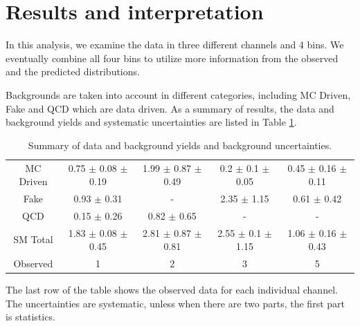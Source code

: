 \section{Results and interpretation}
\label{sect:stat}
In this analysis, we examine the data in three different channels and 4 bins.
We eventually combine all four bins to utilize more information from the observed and the predicted distributions.

Backgrounds are taken into account in different categories, including MC Driven, Fake and QCD which are data driven.
As a summary of results, the data and background yields and systematic uncertainties are listed in Table \ref{tbl:yieldSysSummary}. 
\begin{table}[h]
\begin{center}
\begin{tabular}{c|c|c|c|c}
\hline
\hline
		& \tauTau\binone & \tauTau\bintwo & \eTau\binone & \muTau\binone \\
\hline
MC Driven& 0.75 $\pm$ 0.08 $\pm$ 0.19 & 1.99 $\pm$ 0.87 $\pm$ 0.49  & 0.2 $\pm$ 0.1 $\pm$ 0.05 & 0.45 $\pm$ 0.16  $\pm$ 0.11\\
Fake    &     0.93 $\pm$ 0.31         &           -                 &     2.35 $\pm$ 1.15       &      0.61 $\pm$  0.42\\
QCD     &     0.15 $\pm$ 0.26         &         0.82 $\pm$ 0.65     &           -              &            -       \\
\hline
SM Total  & 1.83 $\pm$ 0.08 $\pm$ 0.45 & 2.81  $\pm$ 0.87 $\pm$0.81  & 2.55 $\pm$ 0.1 $\pm$ 1.15 & 1.06 $\pm$ 0.16  $\pm$ 0.43\\
\hline
\hline
Observed   & 1     & 2     & 3   & 5 \\  
\hline
\hline
\end{tabular}
\caption{Summary of data and background yields and background uncertainties.}
\label{tbl:yieldSysSummary}
\end{center}
\end{table}
The last row of the table shows the observed data for  each individual channel.  The uncertainties are systematic, unless when there are 
two parts, the first part is statistics.

